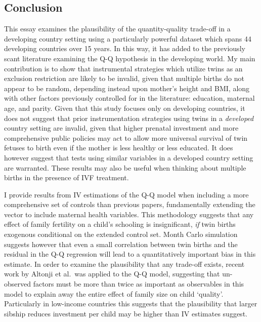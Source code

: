 \documentclass{article}[11pt,subeqn]
\begin{document}
\begin{spacing}{1.5}
\section{Conclusion}
\label{scn:conclusion}
This essay examines the plausibility of the quantity-quality trade-off in a developing country setting using a particularly powerful dataset which spans 44 developing countries over 15 years.  In this way, it has added to the previously scant literature examining the Q-Q hypothesis in the developing world.  My main contribution is to show that instrumental strategies which utilize twins as an exclusion restriction are likely to be invalid, given that multiple births do not appear to be random, depending instead upon mother's height and BMI, along with other factors previously controlled for in the literature: education, maternal age, and parity.  Given that this study focuses only on developing countries, it does not suggest that prior instrumentation strategies using twins in a \emph{developed} country setting are invalid, given that higher prenatal investment and more comprehensive public policies may act to allow more universal survival of twin fetuses to birth even if the mother is less healthy or less educated.  It does however suggest that tests using similar variables in a developed country setting are warranted.  These results may also  be useful when thinking about multiple births in the presence of IVF treatment.

I provide results from IV estimations of the Q-Q model when including a more comprehensive set of controls than previous papers, fundamentally extending the vector to include maternal health variables. This methodology suggests that any effect of family fertility on a child's schooling is insignificant, \emph{if} twin births exogenous conditional on the extended control set.  Month Carlo simulation suggests however that even a small correlation between twin births and the residual in the Q-Q regression will lead to a quantitatively important bias in this estimate.  In order to examine 
the plausibility that any trade-off exists, recent work by Altonji et al.\ was applied to the Q-Q model, suggesting that un-observed factors must be more than twice as important as observables in this model to explain away the entire effect of family size on child `quality'.  Particularly in low-income countries this suggests that the plausibility that larger sibship reduces investment per child may be higher than IV estimates suggest.


\end{spacing}
\end{document}
